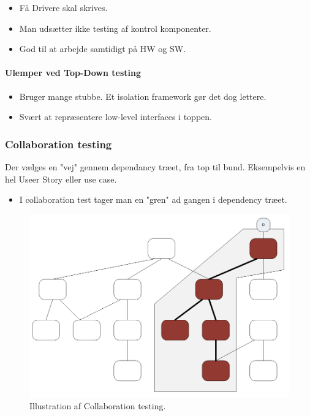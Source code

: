 \begin{itemize}
	\item Få Drivere skal skrives.
	\item Man udsætter ikke testing af kontrol komponenter.
	\item God til at arbejde samtidigt på HW og SW.
\end{itemize}

\paragraph{Ulemper ved Top-Down testing}

\begin{itemize}
	\item Bruger mange stubbe. Et isolation framework gør det dog lettere.
	\item Svært at repræsentere low-level interfaces i toppen. 
\end{itemize}


\subsubsection{Collaboration testing}
Der vælges en "vej" gennem dependancy træet, fra top til bund. Eksempelvis en hel Useer Story eller use case.


\begin{itemize}
	\item I collaboration test tager man en "gren" ad gangen i dependency træet.
\end{itemize}

\begin{figure}
\centering
\includegraphics[width=0.7\linewidth]{figs/collaborationTesting.PNG}
\caption{Illustration af Collaboration testing.}
\label{fig:collaborationTesting}
\end{figure}

